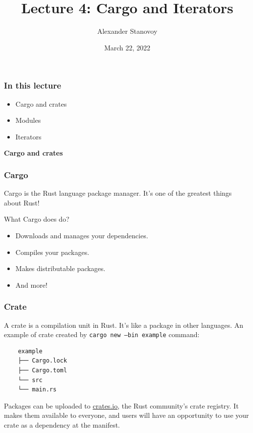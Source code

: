 \documentclass[aspectratio=1610,t]{beamer}
\title{Lecture 4: Cargo and Iterators}
\date{March 22, 2022}
\author{Alexander Stanovoy}
\institute{alex.stanovoy@gmail.com}
\begin{document}

\begin{frame}
\maketitle
\end{frame}


\begin{frame}[fragile]
\frametitle{In this lecture}
\begin{itemize}
    \item Cargo and crates
    \item Modules
    \item Iterators
\end{itemize}
\end{frame}


\begin{frame}[c]
\centering\Huge\textbf{Cargo and crates}
\end{frame}


\begin{frame}[fragile]
\frametitle{Cargo}
Cargo is the Rust language package manager. It's one of the greatest things about Rust!

What Cargo does do?

\begin{itemize}
    \item Downloads and manages your dependencies.
    \item Compiles your packages.
    \item Makes distributable packages.
    \item And more!
\end{itemize}
\end{frame}


\begin{frame}[fragile]
\frametitle{Crate}
A crate is a compilation unit in Rust. It's like a package in other languages. An example of crate created by \texttt{cargo new --bin example} command:

\begin{verbatim}
    example
    ├── Cargo.lock
    ├── Cargo.toml
    └── src
    └── main.rs
\end{verbatim}

Packages can be uploaded to \href{https://crates.io}{crates.io}, the Rust community's crate registry. It makes them available to everyone, and users will have an opportunity to use your crate as a dependency at the manifest.
\end{frame}
\end{document}
